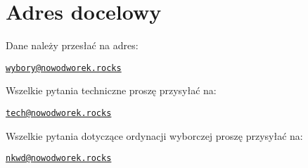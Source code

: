 \appendix

\section{Adres docelowy}

Dane należy przesłać na adres:
\begin{center}\href{mailto:wybory@nowodworek.rocks}{\texttt{wybory@nowodworek.rocks}}\end{center}
Wszelkie pytania techniczne proszę przysyłać na:
\begin{center}\href{mailto:tech@nowodworek.rocks}{\texttt{tech@nowodworek.rocks}}\end{center}
Wszelkie pytania dotyczące ordynacji wyborczej proszę przysyłać na:
\begin{center}\href{mailto:nkwd@nowodworek.rocks}{\texttt{nkwd@nowodworek.rocks}}\end{center}
